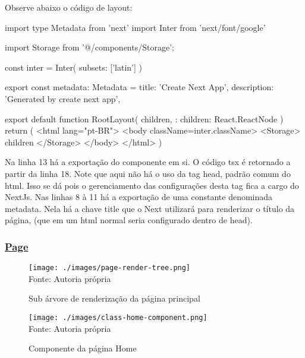 Observe abaixo o código de layout:

\begin{Coded35270b9cd434a3b91d1303aa4089eeb}
import type { Metadata } from 'next'
import { Inter } from 'next/font/google'

import Storage from '@/components/Storage';

const inter = Inter({ subsets: ['latin'] })

export const metadata: Metadata = {
    title: 'Create Next App',
    description: 'Generated by create next app',
}

export default function RootLayout({
    children,
}: {
    children: React.ReactNode
}) {
    return (
        <html lang="pt-BR">
            <body className={inter.className}>
                <Storage>
                    {children}
                </Storage>
            </body>
        </html>
    )
}
\end{Coded35270b9cd434a3b91d1303aa4089eeb}

Na linha 13 há a exportação do componente em si. O código
\acrshort{tsx}
é retornado a partir da linha 18.
Note que aqui não há o uso da tag head, padrão comum do
\acrshort{html}. Isso se dá
pois o gerenciamento das configurações desta tag fica
a cargo do NextJs. Nas linhas 8 à 11
há a exportação de uma constante denominada metadata. Nela
há a chave title que o Next utilizará para renderizar o
título da página, (que em um html normal seria configurado
dentro de head).

\subsubsection{\underline{Page}}

\begin{figure}[H]
    \centering
    \caption{Sub árvore de renderização da página principal}
    \texttt{[image: ./images/page-render-tree.png]}
    \label{fig:page-render-tree} \\
    \textnormal{\fontsize{10pt}{12pt}Fonte: Autoria própria}
\end{figure}

\begin{figure}[H]
    \centering
    \caption{Componente da página Home}
    \texttt{[image: ./images/class-home-component.png]}
    \label{fig:class-home-component} \\
    \textnormal{\fontsize{10pt}{12pt}Fonte: Autoria própria}
\end{figure}

